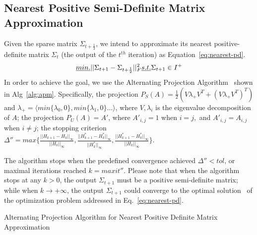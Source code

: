 \documentclass[journal,compsoc]{IEEEtran}
\begin{document}
\subsection{Nearest Positive Semi-Definite Matrix Approximation}
Given the sparse matrix $\Sigma_{t+\frac{1}{2}}$, we intend to approximate its nearest positive-definite matrix $\Sigma_{t}$ (the output of the $t^{th}$ iteration) as Equation~\ref{eq:nearest-pd}. 
%
\begin{equation}
\emph{min. } ||\Sigma_{t+1}-\Sigma_{t+\frac{1}{2}}||_F^2 \emph{ s.t. }\Sigma_{t+1}\in  {\bf }I^+
\label{eq:nearest-pd}
\end{equation}
%
In order to achieve the goal, we use the Alternating Projection Algorithm~\cite{higham2002computing} shown in Alg~\ref{alg:apm}. Specifically, the projection $P_S(A)=\frac{1}{2}(V\lambda_+V^T+(V\lambda_+V^T)^T)$ and  $\lambda_+=\langle min\{\lambda_0,0\},min\{\lambda_1,0\}\dots  \rangle$, where $V,\lambda_i$ is the eigenvalue decomposition of $A$; the projection $P_U(A)=A'$, where $A'_{i,j}=1$ when $i=j,$ and $A'_{i,j}=A_{i,j}$ when $i\neq j$; the stopping criterion $\Delta''=max\{\frac{||H_{k+1}-H_k||_\infty}{||H_k||_\infty}, \frac{||H_{k+1}^*-H_k^*||_\infty}{||H_k^*||_\infty}, \frac{||H_{k+1}^*-H_k^*||_\infty}{||H_k||_\infty}\}$.


The algorithm stops when the predefined convergence achieved $\Delta'' < tol$, or maximal iterations reached $k= maxit''$. Please note that when the algorithm stops at any $k> 0$, the output $\Sigma_{t+1}$ must be a positive semi-definite matrix; while when $k\to+\infty$, the output $\Sigma_{t+1}$ could converge to the optimal solution~\cite{dykstra1983algorithm} of the optimization problem addressed in Eq.~\ref{eq:nearest-pd}.

\begin{algorithm}
\caption{Alternating Projection Algorithm for Nearest Positive Definite Matrix Approximation}
\label{alg:apm}
\end{algorithm}
\end{document}
